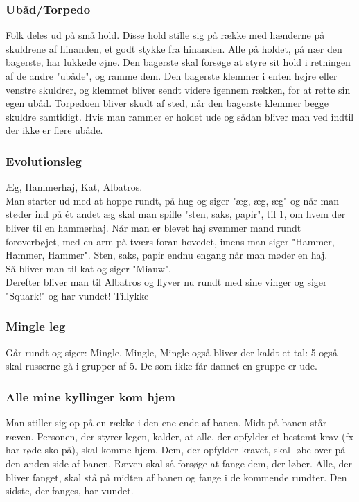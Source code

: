 \documentclass[../../../main.tex]{subfiles}
\begin{document}
\begin{multicols}{2}
\subsubsection*{Ubåd/Torpedo}
Folk deles ud på små hold. Disse hold stille sig på række med hænderne på skuldrene af hinanden, et godt stykke fra hinanden. Alle på holdet, på nær den bagerste, har lukkede øjne. Den bagerste skal forsøge at styre sit hold i retningen af de andre "ubåde", og ramme dem. Den bagerste klemmer i enten højre eller venstre skuldrer, og klemmet bliver sendt videre igennem rækken, for at rette sin egen ubåd. Torpedoen bliver skudt af sted, når den bagerste klemmer begge skuldre samtidigt. Hvis man rammer er holdet ude og sådan bliver man ved indtil der ikke er flere ubåde. 

\subsubsection*{Evolutionsleg}
Æg, Hammerhaj, Kat, Albatros.\\
Man starter ud med at hoppe rundt, på hug og siger "æg, æg, æg" og når man støder ind på ét andet æg skal man spille "sten, saks, papir", til 1, om hvem der bliver til en hammerhaj. Når man er blevet haj svømmer mand rundt foroverbøjet, med en arm på tværs foran hovedet, imens man siger "Hammer, Hammer, Hammer". Sten, saks, papir endnu engang når man møder en haj. \\

Så bliver man til kat og siger "Miauw". \\

Derefter bliver man til Albatros og flyver nu rundt med sine vinger og siger "Squark!" og har vundet! Tillykke

\subsubsection*{Mingle leg}
Går rundt og siger: Mingle, Mingle, Mingle også bliver der kaldt et tal: 5 også skal russerne gå i grupper af 5. De som ikke får dannet en gruppe er ude.

\subsubsection*{Alle mine kyllinger kom hjem}
Man stiller sig op på en række i den ene ende af banen. Midt på banen står ræven. Personen, der styrer legen, kalder, at alle, der opfylder et bestemt krav (fx har røde sko på), skal komme hjem. Dem, der opfylder kravet, skal løbe over på den anden side af banen. Ræven skal så forsøge at fange dem, der løber. Alle, der bliver fanget, skal stå på midten af banen og fange i de kommende rundter. Den sidste, der fanges, har vundet.


\end{multicols}
\end{document}
